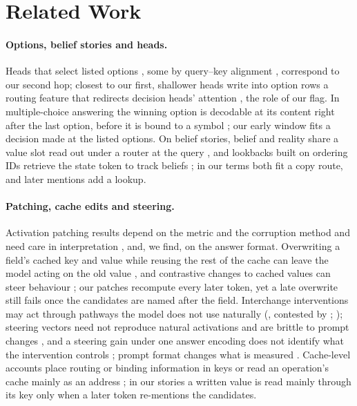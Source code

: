 \section{Related Work}\label{sec:related}

\paragraph{Options, belief stories and heads.}
Heads that select listed options \citep{lieberum2023chinchilla,wiegreffe2025answer}, some by query--key alignment \citep{tulchinskii2024wise}, correspond to our second hop; closest to our first, shallower heads write into option rows a routing feature that redirects decision heads' attention \citep{sun2026persuaded}, the role of our flag. In multiple-choice answering the winning option is decodable at its content right after the last option, before it is bound to a symbol \citep{wong2026decide}; our early window fits a decision made at the listed options. On belief stories, belief and reality share a value slot read out under a router at the query \citep{steele2026routing}, and lookbacks built on ordering IDs retrieve the state token to track beliefs \citep{prakash2025lookbacks}; in our terms both fit a copy route, and later mentions add a lookup.

\paragraph{Patching, cache edits and steering.}
Activation patching results depend on the metric and the corruption method \citep{zhang2023patching} and need care in interpretation \citep{heimersheim2024patching}, and, we find, on the answer format. Overwriting a field's cached key and value while reusing the rest of the cache can leave the model acting on the old value \citep{bojieli2026notes}, and contrastive changes to cached values can steer behaviour \citep{pustovit2026packs}; our patches recompute every later token, yet a late overwrite still fails once the candidates are named after the field. Interchange interventions \citep{geiger2021inducing,geiger2024finding} may act through pathways the model does not use naturally (\citealp{makelov2024subspace}, contested by \citealp{wu2024reply}; \citealp{liu2026wrong}); steering vectors \citep{turner2023actadd,panickssery2023caa} need not reproduce natural activations \citep{shih2026steering} and are brittle to prompt changes \citep{tan2024steering}, and a steering gain under one answer encoding does not identify what the intervention controls \citep{gao2026encodings}; prompt format changes what is measured \citep{sclar2023quantifying,opielka2026causality}. Cache-level accounts place routing or binding information in keys \citep{ma2025addressbook,oh2026rebinding} or read an operation's cache mainly as an address \citep{wu2026record}; in our stories a written value is read mainly through its key only when a later token re-mentions the candidates.
